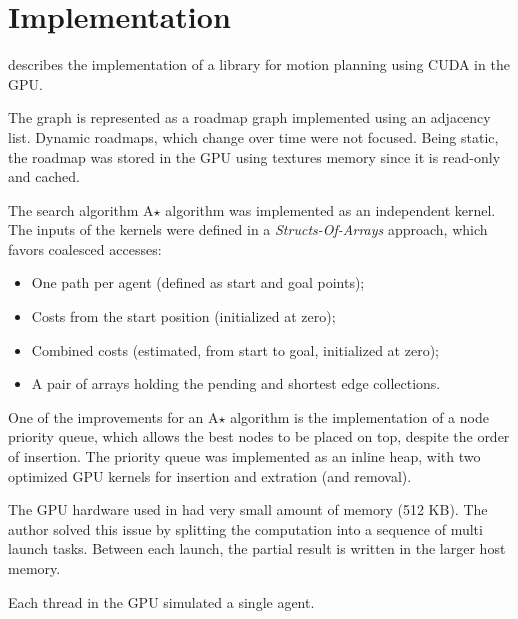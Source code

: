 \section{Implementation}

\citeauthor{bleiweiss08} describes the implementation of a library for motion planning using CUDA in the GPU.

The graph is represented as a roadmap graph implemented using an adjacency list. Dynamic roadmaps, which change over time were not focused. Being static, the roadmap was stored in the GPU using textures memory since it is read-only and cached.

The search algorithm A$\star$ algorithm was implemented as an independent kernel. The inputs of the kernels were defined in a \textit{Structs-Of-Arrays} approach, which favors coalesced accesses:
\begin{itemize}
	\item One path per agent (defined as start and goal points);
	\item Costs from the start position (initialized at zero);
	\item Combined costs (estimated, from start to goal, initialized at zero);
	\item A pair of arrays holding the pending and shortest edge collections.
\end{itemize}

One of the improvements for an A$\star$ algorithm is the implementation of a node priority queue, which allows the best nodes to be placed on top, despite the order of insertion.
The priority queue was implemented as an inline heap, with two optimized GPU kernels for insertion and extration (and removal).

The GPU hardware used in \cite{bleiweiss08} had very small amount of memory (512 KB). The author solved this issue by splitting the computation into a sequence of multi launch tasks. Between each launch, the partial result is written in the larger host memory.

Each thread in the GPU simulated a single agent.